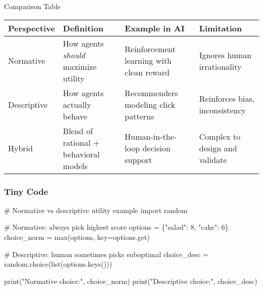 \documentclass[
  letterpaper,
  DIV=11,
  numbers=noendperiod]{scrreprt}
\newenvironment{Shaded}{\begin{snugshade}}{\end{snugshade}}
\newcommand{\BuiltInTok}[1]{\textcolor[rgb]{0.00,0.23,0.31}{#1}}
\newcommand{\CommentTok}[1]{\textcolor[rgb]{0.37,0.37,0.37}{#1}}
\newcommand{\DecValTok}[1]{\textcolor[rgb]{0.68,0.00,0.00}{#1}}
\newcommand{\ImportTok}[1]{\textcolor[rgb]{0.00,0.46,0.62}{#1}}
\newcommand{\NormalTok}[1]{\textcolor[rgb]{0.00,0.23,0.31}{#1}}
\newcommand{\OperatorTok}[1]{\textcolor[rgb]{0.37,0.37,0.37}{#1}}
\newcommand{\StringTok}[1]{\textcolor[rgb]{0.13,0.47,0.30}{#1}}
\begin{document}
Comparison Table

\begin{longtable}[]{@{}
  >{\raggedright\arraybackslash}p{}
  >{\raggedright\arraybackslash}p{}
  >{\raggedright\arraybackslash}p{}
  >{\raggedright\arraybackslash}p{}@{}}
\toprule\noalign{}
\begin{minipage}[b]{\linewidth}\raggedright
Perspective
\end{minipage} & \begin{minipage}[b]{\linewidth}\raggedright
Definition
\end{minipage} & \begin{minipage}[b]{\linewidth}\raggedright
Example in AI
\end{minipage} & \begin{minipage}[b]{\linewidth}\raggedright
Limitation
\end{minipage} \\
\midrule\noalign{}
\endhead
\bottomrule\noalign{}
\endlastfoot
Normative & How agents \emph{should} maximize utility & Reinforcement
learning with clean reward & Ignores human irrationality \\
Descriptive & How agents actually behave & Recommenders modeling click
patterns & Reinforces bias, inconsistency \\
Hybrid & Blend of rational + behavioral models & Human-in-the-loop
decision support & Complex to design and validate \\
\end{longtable}

\subsubsection{Tiny Code}\label{tiny-code-19}

\begin{Shaded}
\begin{Highlighting}[]
\CommentTok{\# Normative vs descriptive utility example}
\ImportTok{import}\NormalTok{ random}

\CommentTok{\# Normative: always pick highest score}
\NormalTok{options }\OperatorTok{=}\NormalTok{ \{}\StringTok{"salad"}\NormalTok{: }\DecValTok{8}\NormalTok{, }\StringTok{"cake"}\NormalTok{: }\DecValTok{6}\NormalTok{\}}
\NormalTok{choice\_norm }\OperatorTok{=} \BuiltInTok{max}\NormalTok{(options, key}\OperatorTok{=}\NormalTok{options.get)}

\CommentTok{\# Descriptive: human sometimes picks suboptimal}
\NormalTok{choice\_desc }\OperatorTok{=}\NormalTok{ random.choice(}\BuiltInTok{list}\NormalTok{(options.keys()))}

\BuiltInTok{print}\NormalTok{(}\StringTok{"Normative choice:"}\NormalTok{, choice\_norm)}
\BuiltInTok{print}\NormalTok{(}\StringTok{"Descriptive choice:"}\NormalTok{, choice\_desc)}
\end{Highlighting}
\end{Shaded}
\end{document}
